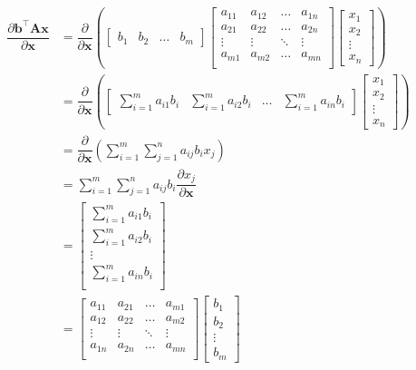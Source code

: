 \documentclass{article}
\newcommand{\trans}{\top}
\begin{document}
\begin{align}
    \dfrac{\partial \mathbf{b}^\trans \mathbf{A} \mathbf{x}}{\partial \mathbf{x}} &= \dfrac{\partial}{\partial \mathbf{x}} \left(
    \begin{bmatrix}
        b_{1} & b_{2} & \dots & b_{m}
    \end{bmatrix}
    \begin{bmatrix}
        a_{11} & a_{12} & \dots & a_{1n} \\
        a_{21} & a_{22} & \dots & a_{2n} \\
        \vdots & \vdots & \ddots & \vdots \\
        a_{m1} & a_{m2} & \dots & a_{mn} \\
    \end{bmatrix} \begin{bmatrix}
        x_{1} \\ x_{2} \\ \vdots \\ x_{n}
    \end{bmatrix} \right) \\
    &= \dfrac{\partial}{\partial \mathbf{x}} \left(
			\begin{bmatrix}
				\displaystyle \sum_{i = 1}^{m} a_{i1}b_{i} & 
				\displaystyle \sum_{i = 1}^{m} a_{i2}b_{i} & 
				\dots & 
				\displaystyle \sum_{i = 1}^{m} a_{in}b_{i}
			\end{bmatrix} \begin{bmatrix}
				x_{1} \\ x_{2} \\ \vdots \\ x_{n}
			\end{bmatrix} \right) \\
    &= \dfrac{\partial}{\partial \mathbf{x}} \left(
        \sum_{i = 1}^{m}\sum_{j = 1}^{n} a_{ij} b_{i} x_{j}
    \right) \\
    &= \sum_{i = 1}^{m}\sum_{j = 1}^{n} a_{ij} b_{i} \dfrac{\partial x_{j}}{\partial \mathbf{x}} \\
    &= \begin{bmatrix}
        \sum_{i = 1}^{m} a_{i1} b_{i} \\
        \sum_{i = 1}^{m} a_{i2} b_{i} \\
        \vdots \\
        \sum_{i = 1}^{m} a_{in} b_{i} \\
    \end{bmatrix} \\
    &= \begin{bmatrix}
        a_{11} & a_{21} & \dots & a_{m1} \\
        a_{12} & a_{22} & \dots & a_{m2} \\
        \vdots & \vdots & \ddots & \vdots \\
        a_{1n} & a_{2n} & \dots & a_{mn} \\
    \end{bmatrix}
    \begin{bmatrix}
        b_1 \\
        b_2 \\
        \vdots \\
        b_m
    \end{bmatrix}
\end{align}
\end{document}
